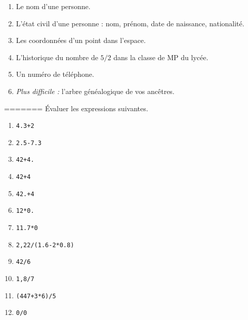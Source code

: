 \begin{enumerate}[label = \emph{\alph*)}]
  \item Le nom d'une personne.
  \item L'état civil d'une personne : nom, prénom, date de naissance, nationalité.
  \item Les coordonnées d'un point dans l'espace.
  \item L'historique du nombre de $5/2$ dans la classe de MP du lycée. 
  \item Un numéro de téléphone. 
  \item \emph{Plus difficile :} l'arbre généalogique de vos ancêtres. 
\end{enumerate}
=======
\'Evaluer les expressions suivantes.
\begin{multicols}{2}
  \begin{enumerate}[label=\emph{\alph*)}]
    \item \texttt{4.3+2}
    \item \texttt{2.5-7.3}
    \item \texttt{42+4.}
    \item \texttt{42+4}
    \item \texttt{42.+4}
    \item \texttt{12*0.}
    \item \texttt{11.7*0}
    \item \texttt{2,22/(1.6-2*0.8)}
    \item \texttt{42/6}
    \item \texttt{1,8/7}
    \item \texttt{(447+3*6)/5}
    \item \texttt{0/0}
  \end{enumerate}
\end{multicols}


